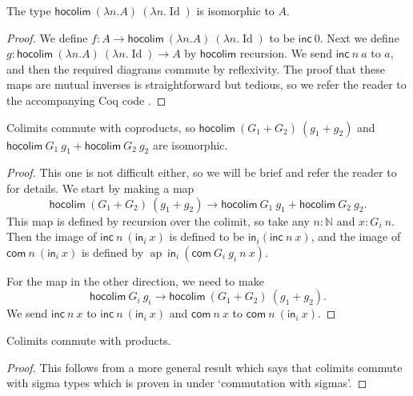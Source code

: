 \documentclass[a4paper,UKenglish]{lipics-v2016}
\newcommand{\Boperator}[1]{\mathsf{#1}}
\newcommand{\inn}{\Boperator{in}}
\newcommand{\ap}[0]{\operatorname{ap}}
\newcommand{\hocolim}[0]{\Boperator{hocolim}}
\newcommand{\inc}[0]{\Boperator{inc}}
\newcommand{\com}[0]{\Boperator{com}}
\begin{document}
\begin{lemma}
\label{lem:colimcon}
The type $\hocolim \> (\lambda n . A) \> (\lambda n . \operatorname{Id})$ is isomorphic to $A$.
\end{lemma}

\begin{proof}
We define $f : A \rightarrow \hocolim \> (\lambda n . A) \> (\lambda n . \operatorname{Id})$ to be $\inc \> 0$.
Next we define $g : \hocolim \> (\lambda n . A) \> (\lambda n . \operatorname{Id}) \rightarrow A$ by $\hocolim$ recursion.
We send $\inc \> n \> a$ to $a$, and then the required diagrams commute by reflexivity.
The proof that these maps are mutual inverses is straightforward but tedious, so we refer the reader to the accompanying Coq code \cite{CoqImpl}.
\end{proof}

\begin{lemma}
\label{lem:colimsum}
Colimits commute with coproducts, so $\hocolim \> (G_1 + G_2) \> (g_1 + g_2)$ and $\hocolim \> G_1 \> g_1 + \hocolim \> G_2 \> g_2$ are isomorphic.
\end{lemma}

\begin{proof}
This one is not difficult either, so we will be brief and refer the reader to \cite{CoqImpl} for details.
We start by making a map 
\[
\hocolim \> (G_1+G_2) \> (g_1 + g_2) \rightarrow \hocolim \> G_1 \> g_1 + \hocolim \> G_2 \> g_2.
\]
This map is defined by recursion over the colimit, so take any $n : \mathbb{N}$ and $x : G_i \> n$.
Then the image of $\inc \> n \> (\inn_i \> x)$ is defined to be $\inn_i (\inc \> n \> x)$, and the image of $\com \> n \> (\inn_i \> x)$ is defined by
$\ap \> \inn_i \> (\com \> G_i \> g_i \> n \> x)$.

For the map in the other direction, we need to make 
\[
\hocolim \> G_i \> g_i \rightarrow \hocolim \> (G_1 + G_2) \> (g_1 + g_2).
\]
We send $\inc \> n \> x$ to $\inc \> n \> (\inn_i \> x)$ and $\com \> n \> x$ to $\com \> n \> (\inn_i \> x)$.
\end{proof}

\begin{lemma}
\label{lem:colimprod}
Colimits commute with products.
\end{lemma}

\begin{proof}
This follows from a more general result which says that colimits commute with sigma types which is proven in \cite{boulier2015colimites,boulier2016} under `commutation with sigmas'.
\end{proof}
\end{document}
